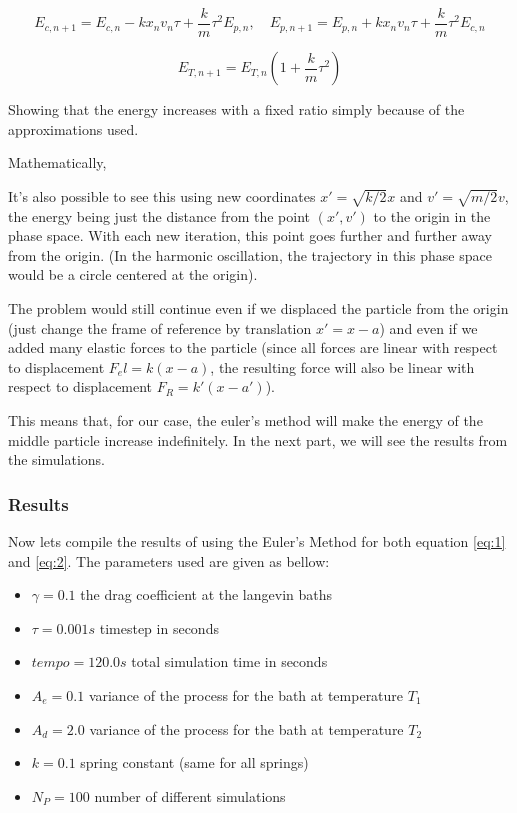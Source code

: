 $$
E_{c,n+1} = E_{c,n} -k x_n v_n \tau + \frac{k}{m} \tau^2 E_{p,n}, \quad
E_{p,n+1} = E_{p,n} + k x_n v_n \tau + \frac{k}{m} \tau^2 E_{c,n}
$$

\begin{equation*}
E_{T, n+1} = E_{T,n}\left(1 + \frac{k}{m}\tau^2\right)
\end{equation*}

Showing that the energy increases with a fixed ratio simply because of the approximations used.

Mathematically, 

It's also possible to see this using new coordinates $x' = \sqrt{k/2}x$ and $v' = \sqrt{m/2}v$, the energy being just the distance from the point $(x',v')$ to the origin in the phase space. With each new iteration, this point goes further and further away from the origin.
(In the harmonic oscillation, the trajectory in this phase space would be a circle centered at the origin).

The problem would still continue even if we displaced the particle from the origin (just change the frame of reference by translation $x' = x-a$) and even if we added many elastic forces to the particle (since all forces are linear with respect to displacement $F_el = k(x-a)$, the resulting force will also be linear with respect to displacement $F_R = k'(x-a')$).

This means that, for our case, the euler's method will make the energy of the middle particle increase indefinitely. In the next part, we will see the results from the simulations.

\subsubsection{Results}
Now lets compile the results of using the Euler's Method for both equation \ref{eq:1} and \ref{eq:2}. The parameters used are given as bellow:

\begin{itemize}
	\item $\gamma = 0.1$ the drag coefficient at the langevin baths
	\item $\tau = 0.001 s$ timestep in seconds
	\item $tempo = 120.0 s$ total simulation time in seconds
	\item $A_e = 0.1$ variance of the process for the bath at temperature $T_1$
	\item $A_d = 2.0$ variance of the process for the bath at temperature $T_2$
	\item $k=0.1$ spring constant (same for all springs)
	\item $N_P = 100$ number of different simulations
\end{itemize}

